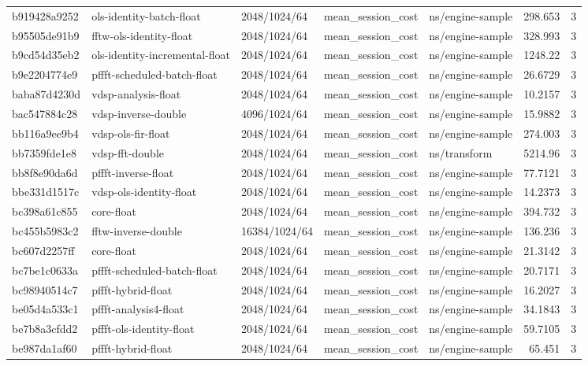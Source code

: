 \begin{longtable}{lllllrr}
b919428a9252 & ols-identity-batch-float & 2048/1024/64 & mean\_session\_cost & ns/engine-sample & 298.653 & 3 \\
b95505de91b9 & fftw-ols-identity-float & 2048/1024/64 & mean\_session\_cost & ns/engine-sample & 328.993 & 3 \\
b9cd54d35eb2 & ols-identity-incremental-float & 2048/1024/64 & mean\_session\_cost & ns/engine-sample & 1248.22 & 3 \\
b9e2204774e9 & pffft-scheduled-batch-float & 2048/1024/64 & mean\_session\_cost & ns/engine-sample & 26.6729 & 3 \\
baba87d4230d & vdsp-analysis-float & 2048/1024/64 & mean\_session\_cost & ns/engine-sample & 10.2157 & 3 \\
bac547884c28 & vdsp-inverse-double & 4096/1024/64 & mean\_session\_cost & ns/engine-sample & 15.9882 & 3 \\
bb116a9ee9b4 & vdsp-ols-fir-float & 2048/1024/64 & mean\_session\_cost & ns/engine-sample & 274.003 & 3 \\
bb7359fde1e8 & vdsp-fft-double & 2048/1024/64 & mean\_session\_cost & ns/transform & 5214.96 & 3 \\
bb8f8e90da6d & pffft-inverse-float & 2048/1024/64 & mean\_session\_cost & ns/engine-sample & 77.7121 & 3 \\
bbe331d1517c & vdsp-ols-identity-float & 2048/1024/64 & mean\_session\_cost & ns/engine-sample & 14.2373 & 3 \\
bc398a61c855 & core-float & 2048/1024/64 & mean\_session\_cost & ns/engine-sample & 394.732 & 3 \\
bc455b5983c2 & fftw-inverse-double & 16384/1024/64 & mean\_session\_cost & ns/engine-sample & 136.236 & 3 \\
bc607d2257ff & core-float & 2048/1024/64 & mean\_session\_cost & ns/engine-sample & 21.3142 & 3 \\
bc7be1c0633a & pffft-scheduled-batch-float & 2048/1024/64 & mean\_session\_cost & ns/engine-sample & 20.7171 & 3 \\
bc98940514c7 & pffft-hybrid-float & 2048/1024/64 & mean\_session\_cost & ns/engine-sample & 16.2027 & 3 \\
be05d4a533c1 & pffft-analysis4-float & 2048/1024/64 & mean\_session\_cost & ns/engine-sample & 34.1843 & 3 \\
be7b8a3cfdd2 & pffft-ols-identity-float & 2048/1024/64 & mean\_session\_cost & ns/engine-sample & 59.7105 & 3 \\
be987da1af60 & pffft-hybrid-float & 2048/1024/64 & mean\_session\_cost & ns/engine-sample & 65.451 & 3 \\

\end{longtable}
